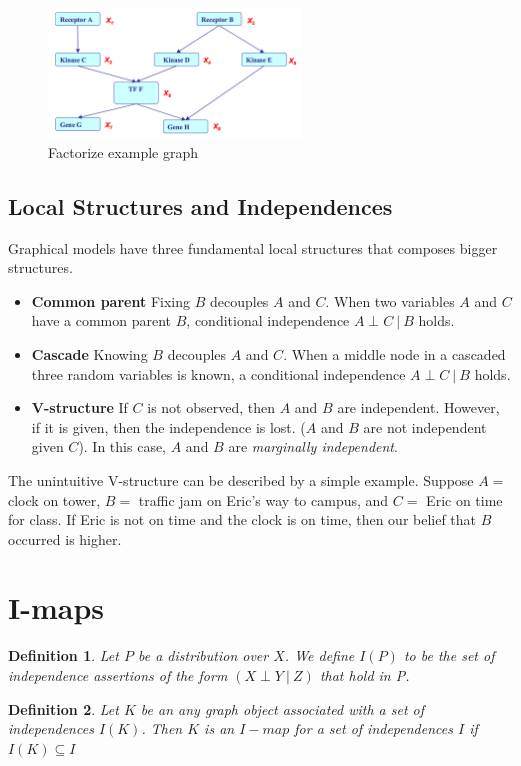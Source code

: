 \documentclass[twoside]{article}
\newtheorem{Defn}{Definition}[section]
\begin{document}
\begin{figure}
\centering
\includegraphics[width=0.6\textwidth]{assets/factorize_example.png}
\caption{\label{fig:factorize_example}Factorize example graph}
\end{figure}

\subsection{Local Structures and Independences}

Graphical models have three fundamental local structures that composes bigger structures.

\begin{itemize}
\item \textbf{Common parent} Fixing \(B\) decouples \(A\) and \(C\). When two variables \(A\) and \(C\) have a common parent \(B\), conditional independence \(A\perp C\ |\ B\) holds.
\item \textbf{Cascade} Knowing \(B\) decouples \(A\) and \(C\). When a middle node in a cascaded three random variables is known, a conditional independence \(A\perp C\ |\ B\) holds.
\item \textbf{V-structure} If \(C\) is not observed, then \(A\) and \(B\) are independent. However, if it is given, then the independence is lost. (\(A\) and \(B\) are not independent given \(C\)). In this case, \(A\) and \(B\) are \emph{marginally independent}.
\end{itemize} 

The unintuitive V-structure can be described by a simple example. Suppose \(A = \) clock on tower, \(B = \) traffic jam on Eric's way to campus, and \(C = \) Eric on time for class. If Eric is not on time and the clock is on time, then our belief that \(B\) occurred is higher.

\section{I-maps}

\begin{Defn}
Let \(P\) be a distribution over \(X\). We define \(I(P)\) to be the set of independence assertions of the form \((X \perp Y\ |\ Z)\) that hold in P.
\end{Defn}
\begin{Defn}
Let \(K\) be an any graph object associated with a set of independences \(I(K)\). Then \(K\) is an \(I-map\) for a set of independences \(I\) if \(I(K) \subseteq I\)
\end{Defn}
\end{document}
